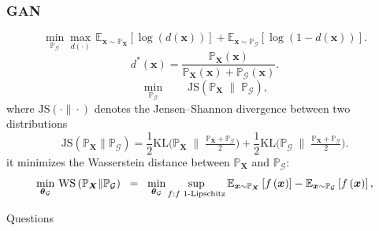 \documentclass[presentation]{beamer}
\begin{document}
\begin{frame}
    \frametitle{GAN}
    \begin{equation}\label{eq:GAN-new}
        \min_{\mathbb{P}_{\mathcal{G}}}\max_{d(\cdot)}\,\mathbb{E}_{\bm{x}\sim\mathbb{P}_{\bm{X}}}\left[\log\left(d\left(\bm{x}\right)\right)\right]+\mathbb{E}_{\bm{x}\sim\mathbb{P}_{\mathcal{G}}}\left[\log\left(1-d\left(\bm{x}\right)\right)\right].
    \end{equation}
    \pause
    \begin{equation}
        d^{*}\left(\bm{x}\right)=\frac{\mathbb{P}_{\bm{X}}\left(\bm{x}\right)}{\mathbb{P}_{\bm{X}}\left(\bm{x}\right)+\mathbb{P}_{\mathcal{G}}\left(\bm{x}\right)}.
    \end{equation}
    \pause
    \begin{equation}
        \min_{\mathbb{P}_{\mathcal{G}}}\qquad\text{JS}\left(\mathbb{P}_{\bm{X}}\;\|\;\mathbb{P}_{\mathcal{G}}\right)\label{eq:JS-min},
    \end{equation}
    where $\text{JS}(\cdot\|\cdot)$ denotes the Jensen--Shannon divergence
    between two distributions
    \begin{equation}
        \text{JS}\left(\mathbb{P}_{\bm{X}}\|\mathbb{P}_{\mathcal{G}}\right)=\frac{1}{2}\text{KL}\big(\mathbb{P}_{\bm{X}}\;\|\;\tfrac{\mathbb{P}_{\bm{X}}+\mathbb{P}_{\mathcal{G}}}{2}\big)+\frac{1}{2}\text{KL}\big(\mathbb{P}_{\mathcal{G}}\;\|\;\tfrac{\mathbb{P}_{\bm{X}}+\mathbb{P}_{\mathcal{G}}}{2}\big).
    \end{equation}
    it minimizes
    the Wasserstein distance between $\mathbb{P}_{\bm{X}}$ and $\mathbb{P}_{\mathcal{G}}$:
    \begin{equation}
        \min_{\text{\boldmath $\theta$}_{\mathcal{G}}}\, \text{WS}\left(\mathbb{P}_{\bm{X}}\|\mathbb{P}_{\mathcal{G}}\right)\;\;=\;\;\min_{\text{\boldmath $\theta$}_{\mathcal{G}}}\sup_{f:f\text{ 1-Lipschitz}}\mathbb{E}_{\bm{x}\sim\mathbb{P}_{\bm{X}}}
        \left[f\left(\bm{x}\right)\right]-\mathbb{E}_{\bm{x}\sim
        \mathbb{P}_{\mathcal{G}}}\left[f\left(\bm{x}\right)\right],\label{eq:WS-GAN}
    \end{equation}

\end{frame}

\begin{frame}[standout]
    Questions
\end{frame}
\end{document}
